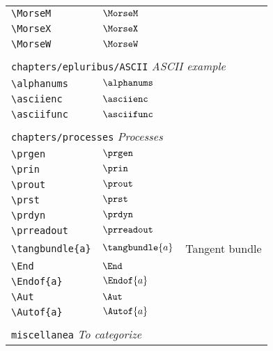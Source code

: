 \begin{longtable}{lll}
 {\color[rgb]{0.5,0.5,0.5}\texttt{\textbackslash MorseM}} & $\MorseM$ & \\ 
 {\color[rgb]{0.5,0.5,0.5}\texttt{\textbackslash MorseX}} & $\MorseX$ & \\ 
 {\color[rgb]{0.5,0.5,0.5}\texttt{\textbackslash MorseW}} & $\MorseW$ & \\ 
  &  & \\ 
 \multicolumn{3}{l}{{\color[rgb]{0.5,0.5,0.5}\texttt{chapters/epluribus/ASCII}} \emph{ASCII example}}\\ 
 \hline
{\color[rgb]{0.5,0.5,0.5}\texttt{\textbackslash alphanums}} & $\alphanums$ & \\ 
 {\color[rgb]{0.5,0.5,0.5}\texttt{\textbackslash asciienc}} & $\asciienc$ & \\ 
 {\color[rgb]{0.5,0.5,0.5}\texttt{\textbackslash asciifunc}} & $\asciifunc$ & \\ 
  &  & \\ 
 \multicolumn{3}{l}{{\color[rgb]{0.5,0.5,0.5}\texttt{chapters/processes}} \emph{Processes}}\\ 
 \hline
{\color[rgb]{0.5,0.5,0.5}\texttt{\textbackslash prgen}} & $\prgen$ & \\ 
 {\color[rgb]{0.5,0.5,0.5}\texttt{\textbackslash prin}} & $\prin$ & \\ 
 {\color[rgb]{0.5,0.5,0.5}\texttt{\textbackslash prout}} & $\prout$ & \\ 
 {\color[rgb]{0.5,0.5,0.5}\texttt{\textbackslash prst}} & $\prst$ & \\ 
 {\color[rgb]{0.5,0.5,0.5}\texttt{\textbackslash prdyn}} & $\prdyn$ & \\ 
 {\color[rgb]{0.5,0.5,0.5}\texttt{\textbackslash prreadout}} & $\prreadout$ & \\ 
 {\color[rgb]{0.5,0.5,0.5}\texttt{\textbackslash tangbundle\{a\}}} & $\tangbundle{a}$ &  Tangent bundle\\ 
 {\color[rgb]{0.5,0.5,0.5}\texttt{\textbackslash End}} & $\End$ & \\ 
 {\color[rgb]{0.5,0.5,0.5}\texttt{\textbackslash Endof\{a\}}} & $\Endof{a}$ & \\ 
 {\color[rgb]{0.5,0.5,0.5}\texttt{\textbackslash Aut}} & $\Aut$ & \\ 
 {\color[rgb]{0.5,0.5,0.5}\texttt{\textbackslash Autof\{a\}}} & $\Autof{a}$ & \\ 
  &  & \\ 
 \multicolumn{3}{l}{{\color[rgb]{0.5,0.5,0.5}\texttt{miscellanea}} \emph{To categorize}}\\ 
 \hline
\hline

\end{longtable}
